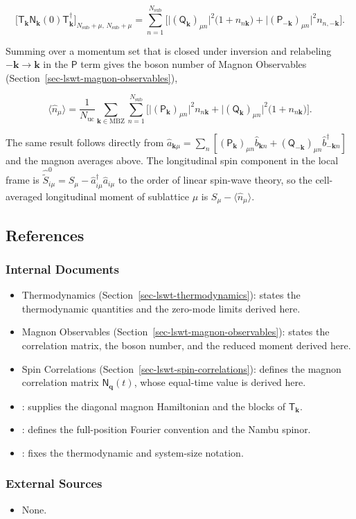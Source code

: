 \[
\Big[\mathsf T_{\mathbf k}\mathsf N_{\mathbf k}(0)\mathsf T_{\mathbf k}^\dagger\Big]_{N_{\mathrm{sub}}+\mu,\,N_{\mathrm{sub}}+\mu}
=\sum_{n=1}^{N_{\mathrm{sub}}}\Big[\big|(\mathsf Q_{\mathbf k})_{\mu n}\big|^2\big(1+n_{n\mathbf k}\big)+\big|(\mathsf P_{-\mathbf k})_{\mu n}\big|^2n_{n,-\mathbf k}\Big].
\]

Summing over a momentum set that is closed under inversion and relabeling \(-\mathbf k\to\mathbf k\) in the \(\mathsf P\) term gives the boson number of Magnon Observables (Section~\ref{sec-lswt-magnon-observables}),

\[
\langle\hat n_\mu\rangle=\frac{1}{N_{\mathrm{uc}}}\sum_{\mathbf k\in\mathrm{MBZ}}\sum_{n=1}^{N_{\mathrm{sub}}}\Big[\big|(\mathsf P_{\mathbf k})_{\mu n}\big|^2n_{n\mathbf k}+\big|(\mathsf Q_{\mathbf k})_{\mu n}\big|^2\big(1+n_{n\mathbf k}\big)\Big].
\]

The same result follows directly from \(\hat a_{\mathbf k\mu}=\sum_n[(\mathsf P_{\mathbf k})_{\mu n}\hat b_{\mathbf kn}+(\mathsf Q_{-\mathbf k})_{\mu n}\hat b_{-\mathbf kn}^\dagger]\) and the magnon averages above. The longitudinal spin component in the local frame is \(\hat{\widetilde S}_{i\mu}^0=S_\mu-\hat a_{i\mu}^\dagger\hat a_{i\mu}\) to the order of linear spin-wave theory, so the cell-averaged longitudinal moment of sublattice \(\mu\) is \(S_\mu-\langle\hat n_\mu\rangle\).

\subsection{References}

\subsubsection{Internal Documents}

\begin{itemize}
\tightlist
\item
  Thermodynamics (Section~\ref{sec-lswt-thermodynamics}): states the thermodynamic quantities and the zero-mode limits derived here.
\item
  Magnon Observables (Section~\ref{sec-lswt-magnon-observables}): states the correlation matrix, the boson number, and the reduced moment derived here.
\item
  Spin Correlations (Section~\ref{sec-lswt-spin-correlations}): defines the magnon correlation matrix \(\mathsf N_{\mathbf q}(t)\), whose equal-time value is derived here.
\item
  : supplies the diagonal magnon Hamiltonian and the blocks of \(\mathsf T_{\mathbf k}\).
\item
  : defines the full-position Fourier convention and the Nambu spinor.
\item
  : fixes the thermodynamic and system-size notation.
\end{itemize}

\subsubsection{External Sources}

\begin{itemize}
\tightlist
\item
  None.
\end{itemize}
